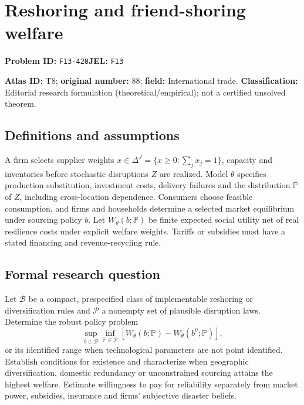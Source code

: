 \documentclass[11pt,a4paper]{article}
\begin{document}
\section*{Reshoring and friend-shoring welfare}
\textbf{Problem ID:} \texttt{F13-420}\quad \textbf{JEL:} \texttt{F13}\par
\label{problem:OP-0088}
\label{atlas:prob:T8}

\noindent\textbf{Atlas ID:} T8; \textbf{original number:} 88; \textbf{field:} International trade. \textbf{Classification:} Editorial research formulation (theoretical/empirical); not a certified unsolved theorem.

\subsection*{Definitions and assumptions}
A firm selects supplier weights $x\in\Delta^J=\{x\ge0:\sum_jx_j=1\}$, capacity and inventories before stochastic disruptions $Z$ are realized. Model $\theta$ specifies production substitution, investment costs, delivery failures and the distribution $\mathbb P$ of $Z$, including cross-location dependence. Consumers choose feasible consumption, and firms and households determine a selected market equilibrium under sourcing policy $b$. Let $W_\theta(b;\mathbb P)$ be finite expected social utility net of real resilience costs under explicit welfare weights. Tariffs or subsidies must have a stated financing and revenue-recycling rule.

\subsection*{Formal research question}
Let $\mathcal B$ be a compact, prespecified class of implementable reshoring or diversification rules and $\mathcal P$ a nonempty set of plausible disruption laws. Determine the robust policy problem
\[
 \sup_{b\in\mathcal B}\inf_{\mathbb P\in\mathcal P}
  [W_\theta(b;\mathbb P)-W_\theta(b^0;\mathbb P)],
\]
or its identified range when technological parameters are not point identified. Establish conditions for existence and characterize when geographic diversification, domestic redundancy or unconstrained sourcing attains the highest welfare. Estimate willingness to pay for reliability separately from market power, subsidies, insurance and firms’ subjective disaster beliefs.
\end{document}
